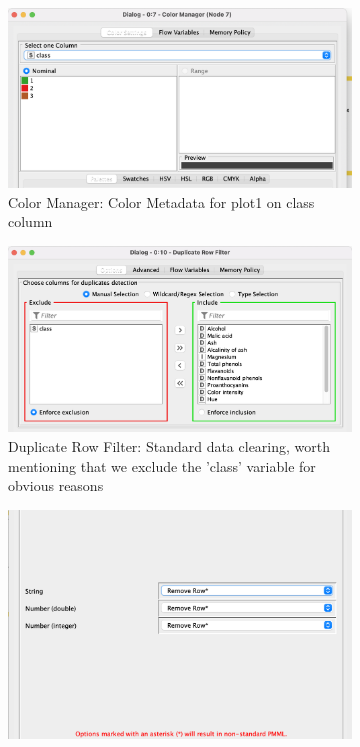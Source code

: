 \documentclass[11pt]{article}
\begin{document}
			\begin{figure}[H]
				\centering
				\begin{subfigure}{0.4\textwidth}
					\includegraphics[width=\textwidth]{res/t1/t11/t11-color-manager-conf}
					\caption{Color Manager: Color Metadata for plot1 on class column}
					\label{fig:first}
				\end{subfigure}
				\hfill
				\begin{subfigure}{0.4\textwidth}
					\includegraphics[width=\textwidth]{res/t1/t11/t11-duplicate-row-conf}
					\caption{Duplicate Row Filter:  Standard data clearing, worth mentioning that we exclude the 'class' variable for obvious reasons}
					\label{fig:second}
				\end{subfigure}
				\hfill
				\begin{subfigure}{0.4\textwidth}
					\includegraphics[scale=0.2]{res/t1/t11/t11-missing-values-conf}

\end{subfigure}
\end{figure}
\end{document}
